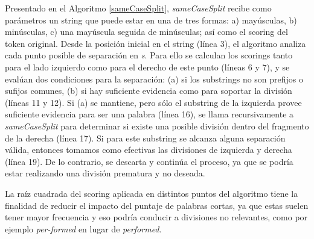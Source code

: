 Presentado en el Algoritmo \ref{sameCaseSplit}, \textit{sameCaseSplit} recibe como parámetros un string que puede estar en una de tres formas: a) mayúsculas, b) minúsculas, c) una mayúscula seguida de minúsculas; así como el scoring del token original.
Desde la posición inicial en el string (línea 3), el algoritmo analiza cada punto posible de separación en \textit{s}.
Para ello se calculan los scorings tanto para el lado izquierdo como para el derecho de este punto (líneas 6 y 7), y se evalúan dos condiciones para la separación: (a) si los substrings no son prefijos o sufijos comunes, (b) si hay suficiente evidencia como para soportar la división (líneas 11 y 12).
Si (a) se mantiene, pero sólo el substring de la izquierda provee suficiente evidencia para ser una palabra (línea 16), se llama recursivamente a \textit{sameCaseSplit} para determinar si existe una posible división dentro del fragmento de la derecha (línea 17).
Si para este substring se alcanza alguna separación válida, entonces tomamos como efectivas las divisiones de izquierda y derecha (línea 19).
De lo contrario, se descarta y continúa el proceso, ya que se podría estar realizando una división prematura y no deseada.

La raíz cuadrada del scoring aplicada en distintos puntos del algoritmo tiene la finalidad de reducir el impacto del puntaje de palabras cortas, ya que estas suelen tener mayor frecuencia y eso podría conducir a divisiones no relevantes, como por ejemplo \textit{per-formed} en lugar de \textit{performed}.

